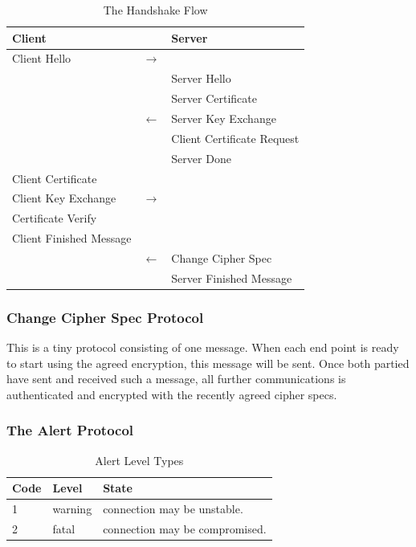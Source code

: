 \documentclass[11pt,a4paper, twocolumn]{article}
\begin{document}
\begin{table}[h!]
\begin{center}
\begin{tabular}{ p{3cm} |  l |  p{3cm}  }
Client & & Server \\
\hline
\cellcolor[gray]{0.8} Client Hello     & $\rightarrow$   &  \\
\hline
     &  &\cellcolor[gray]{0.8} Server Hello\\
     &    &\cellcolor[gray]{0.8} Server Certificate \\
     & $\leftarrow$    &\cellcolor[gray]{0.8} Server Key Exchange \\
     &    &\cellcolor[gray]{0.8} Client Certificate Request \\
     &    &\cellcolor[gray]{0.8} Server Done \\
\hline
\cellcolor[gray]{0.8}Client Certificate    &   & \\
\cellcolor[gray]{0.8}Client Key Exchange    &  $\rightarrow$  & \\
\cellcolor[gray]{0.8}Certificate Verify    &   & \\
\cellcolor[gray]{0.8}Client Finished Message    &   & \\
\hline
     &   $\leftarrow$  &\cellcolor[gray]{0.8} Change Cipher Spec \\
     &    & \cellcolor[gray]{0.8}Server Finished Message \\
\hline
\end{tabular}
\end{center}
\caption{The Handshake Flow}
\label{handshake_flow}
\end{table}

\subsubsection{Change Cipher Spec Protocol}
This is a tiny protocol consisting of one message. When each end point is ready to start using the agreed encryption, this message will be sent. Once both partied have sent and received such a message, all further communications is authenticated and encrypted with the recently agreed cipher specs.

\subsubsection{The Alert Protocol}

\begin{table}[h!]
\begin{center}
\begin{tabular}{| l |  l |  p{3cm} | }
\hline
Code & Level & State \\
\hline
 1  & warning  & connection may be unstable.  \\
\hline
2 & fatal & connection may be compromised. \\
\hline
\end{tabular}
\end{center}
\caption{Alert Level Types}
\label{alert_level}
\end{table}
\end{document}

